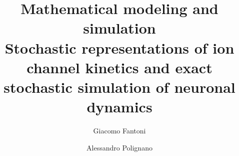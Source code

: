 \documentclass[
  journal=pasa,
  manuscript=project\ report, %
  year=2020,
  volume=37,
]{cup-journal}
\title{Mathematical modeling and simulation \\ \small{Stochastic representations of ion channel kinetics and exact stochastic simulation of neuronal dynamics}}
\author{Giacomo Fantoni}
\author{Alessandro Polignano}
\begin{document}



\appendix
\label{appendix}

\end{document}

